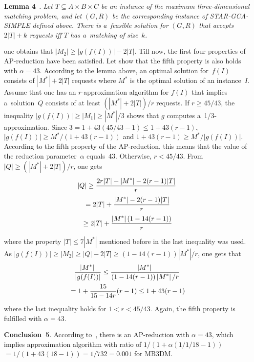 \begin{multicols}{2}
\smallskip

\noindent
\textbf{Lemma 4}~\cite{AEMSSW2005}.
\textit{Let $T \subseteq A \times B \times C$ be an
instance of the maximum three-dimensional matching problem, and let
$(G,R)$ be the corresponding instance of STAR-GCA-SIMPLE defined
above. There is a~feasible solution for $(G,R)$ that accepts
$2|T|+k$ requests iff $T$ has a~matching of size~$k$.}


\smallskip

\noindent
one obtains that $|M_2| \geq |g(f(I))|-2|T|$. Till now,
the first four properties of AP-reduction have been satisfied. Let show
that the fifth property is also holds with $\alpha=43$. According to
the lemma above, an optimal solution for~$f(I)$ consists of
$|M^*|+2|T|$ requests where $M^*$ is the optimal solution of an
instance~$I$. Assume that one has an $r$-approximation algorithm for
$f(I)$ that implies a~solution~$Q$ consists of at least
$(|M^*|+2|T|)/r$ requests. If $r \geq 45/43$, the inequality
$|g(f(I))| \geq |M_1| \geq |M^*|/3$ shows that $g$ computes a~1/3-approximation.
Since $3=1+43(45/43-1)$\linebreak $ \leq 1+43(r-1)$,
$|g(f(I))| \geq {M^*}/({1+43(r-1)})$ and $1+43(r-1) \geq
{M^*}/{|g(f(I))|}$. According to the fifth property of the
AP-reduction, this means that the value of the reduction parameter~$\alpha$
equals~43. Otherwise, $r < 45/43$. From $|Q| \geq
(|M^*|+2|T|)/r$, one  gets
\begin{multline*}
|Q| \geq \displaystyle\frac{\displaystyle 2r|T|+\left\vert M^*\right\vert -2(r-1)|T|\mathstrut}{\displaystyle r\mathstrut}\\
{} =
2|T|+ \displaystyle\frac{\displaystyle \left\vert M^*\right\vert-2(r-1)|T|\mathstrut}{\displaystyle r\mathstrut} \\
{}\geq 2|T|+
\displaystyle\frac{\displaystyle \left\vert M^*\right\vert(1-14(r-1))\mathstrut}{\displaystyle r\mathstrut}
\end{multline*}
 where the property $|T| \leq
7|M^*|$ mentioned before in the last inequality was used. As $|g(f(I))| \geq
|M_2| $\linebreak $\geq |Q|-2|T| \geq {(1-14(r-1))|M^*|}/{r}$, one gets that
\begin{multline*}
\displaystyle\frac{\displaystyle \left\vert M^*\right\vert\mathstrut}{\displaystyle |g(f(I))|\mathstrut} \leq \displaystyle\frac{\displaystyle \left\vert M^*\right\vert\mathstrut}{\displaystyle (1-14(r-1))\left\vert M^*\right\vert/r\mathstrut}\\
{} =
1+\displaystyle\frac{\displaystyle 15\mathstrut}{\displaystyle 15-14r\mathstrut}(r-1) \leq 1+43(r-1)
\end{multline*}
 where the last inequality
holds for $1<r<45/43$. Again, the fifth property is fulfilled with
$\alpha=43$.

\smallskip

\noindent
\textbf{Conclusion~5}.
According to~\cite{AEMSSW2005}, there is an AP-reduction with
$\alpha=43$, which implies approximation algorithm with ratio of
$1/(1+\alpha(1/1/18-1))$\linebreak $=1/(1+43(18-1))=1/732=0.001$ for {MB3DM}.


\end{multicols}
